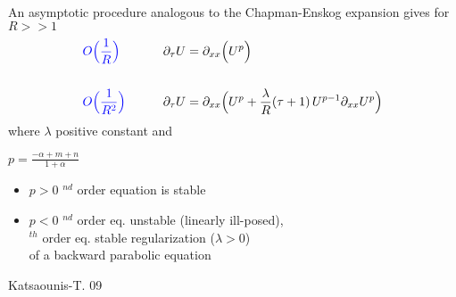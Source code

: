\documentclass{beamer}
\begin{document}
\begin{frame}\frametitle{}

{\small

An asymptotic procedure analogous to the {\color{blue} Chapman-Enskog expansion } gives
for $R >> 1$
\begin{alignat*}{2}
&{\color{blue} O\Big ( \frac{1}{R} \Big )  } \qquad 
 &&\partial_\tau U = \partial_{xx} \Big (    U^p \Big )
  \\
 &  &&
\\
&{\color{blue} O\Big ( \frac{1}{R^2} \Big ) } \qquad 
 &&\partial_\tau U = \partial_{xx} \Big (   U^p  +  \frac{\lambda }{R} ( \tau+1) 
                                                                                         \, U^{p-1} \partial_{xx} U^p  \Big )
\end{alignat*}
where $\lambda$ positive constant and 
\vspace{0.5cm}

\centerline{ {\color{blue} $p = \frac{-\alpha + m +n}{1+\alpha}$  } }
\begin{itemize}
\item[] {\color{blue} $p > 0$  } $^{nd}$ order equation is stable
\item[] {\color{blue} $p < 0$  } $^{nd}$ order eq. unstable (linearly ill-posed), \\
       \qquad {}$^{th}$ order eq. stable regularization ($\lambda>0$) \\
      \qquad \qquad \qquad           of  a backward parabolic equation
\end{itemize}

\vskip -10pt
\hfill {\footnotesize \color{red} Katsaounis-T. 09 }
}

\end{frame}
\end{document}
